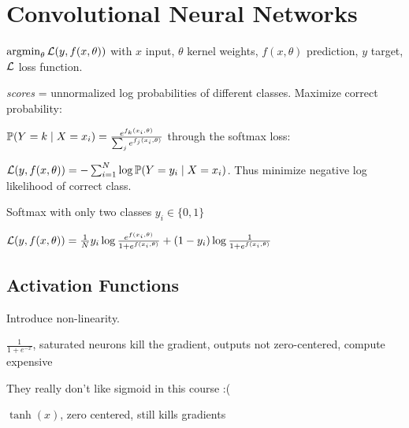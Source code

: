 \section{Convolutional Neural Networks}

\begin{definition}
  \(\argmin_\theta \L(y, f(x, \theta))\) with
  \(x\) input, \(\theta\) kernel weights, \(f(x, \theta)\) prediction, \(y\) target, \(\L\) loss function.
\end{definition}

\begin{algorithm}
  \textit{scores} = unnormalized log probabilities of different classes. Maximize correct probability:

  \(\P(Y = k \mid X = x_i) = \frac{e^{f_k(x_i, \theta)}}{\sum_j e^{f_j(x_i, \theta)}}\) through the softmax loss:
  
  \(\L(y, f(x, \theta)) = - \sum_{i=1}^N \log \P(Y = y_i \mid X = x_i)\). Thus minimize negative log likelihood of correct class.
\end{algorithm}

\begin{algorithm}
  Softmax with only two classes \(y_i \in \{0, 1\}\)
  \begin{center}
    \(\L(y, f(x, \theta)) = \frac{1}{N}y_i \log \frac{e^{f(x_i, \theta)}}{1 + e^{f(x_i, \theta)}} + (1 - y_i) \log \frac{1}{1 + e^{f(x_i, \theta)}}\)
  \end{center}
\end{algorithm}

\subsection{Activation Functions}
\begin{definition}
  Introduce non-linearity.
\end{definition}

\begin{definition}[Sigmoid]
  \(\frac{1}{1 + e^{-x}}\), saturated neurons kill the gradient, outputs not zero-centered, compute expensive
\end{definition}

\begin{theorem}
  They really don't like sigmoid in this course :(
\end{theorem}

\begin{definition}[tanh]
  \(\tanh(x)\), zero centered, still kills gradients
\end{definition}

